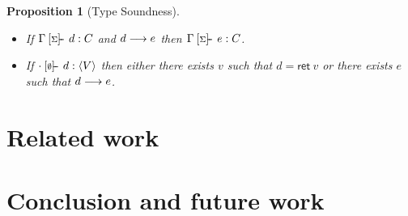 \documentclass[preprint]{sigplanconf}
\newcommand{\sigentails}[1]{\mathbin{[{\text{\scriptsize ${#1}$}}]\!\text{-\!-}}\,}
\newcommand{\comp}[4]  {#1 \sigentails{#2} {#3} : {#4}}
\newcommand{\rt}[1]{\langle{#1}\rangle}   %
\newcommand{\compgs}{\comp{\Gamma}{\sigs}}
\newtheorem{proposition}[theorem]{Proposition}
\newcommand{\sigs}{\Sigma}
\newcommand{\key}[1]{\mathsf{#1}}
\begin{document}
\begin{proposition}[Type Soundness]
~
\begin{itemize}
\item If $\compgs{d}{C}$ and $d \longrightarrow e$ then $\compgs{e}{C}$.
\item If $\comp{\cdot}{\emptyset}{d}{\rt{V}}$ then either there exists $v$
  such that $d = \key{ret}~v$ or there exists $e$ such that $d \longrightarrow
  e$.
\end{itemize}
\end{proposition}

\section{Related work}
\label{sec:related}


\section{Conclusion and future work}
\label{sec:conclusion}



















\end{document}
